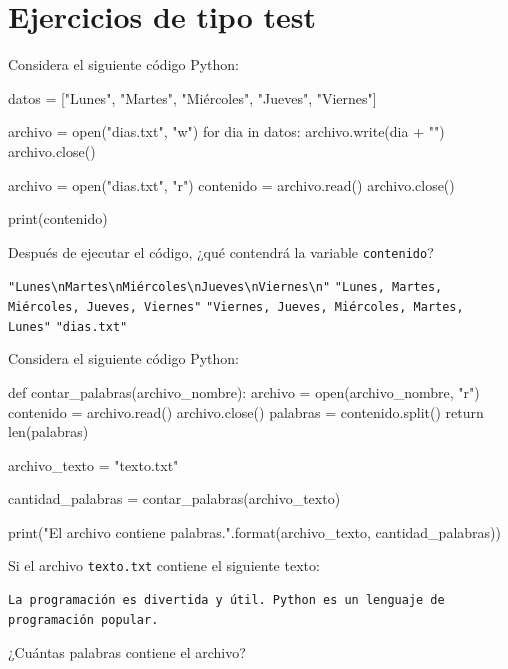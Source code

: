 \section*{Ejercicios de tipo test}



\begin{ejercicio}
Considera el siguiente código Python:

\begin{python}
datos = ["Lunes", "Martes", "Miércoles", "Jueves", "Viernes"]

archivo = open("dias.txt", "w")
for dia in datos:
    archivo.write(dia + "\n")
archivo.close()

archivo = open("dias.txt", "r")
contenido = archivo.read()
archivo.close()

print(contenido)
\end{python}

Después de ejecutar el código, ¿qué contendrá la variable \texttt{contenido}?

\begin{choices}
    \choice \texttt{"Lunes\textbackslash nMartes\textbackslash nMiércoles\textbackslash nJueves\textbackslash nViernes\textbackslash n"}
    \choice \texttt{"Lunes, Martes, Miércoles, Jueves, Viernes"}
    \choice \texttt{"Viernes, Jueves, Miércoles, Martes, Lunes"}
    \choice \texttt{"dias.txt"}
\end{choices}

\end{ejercicio}

\begin{ejercicio}
Considera el siguiente código Python:

\begin{python}
def contar_palabras(archivo_nombre):
    archivo = open(archivo_nombre, "r")
    contenido = archivo.read()
    archivo.close()
    palabras = contenido.split()
    return len(palabras)

archivo_texto = "texto.txt"

cantidad_palabras = contar_palabras(archivo_texto)

print("El archivo {} contiene {} palabras.".format(archivo_texto, cantidad_palabras))
\end{python}

Si el archivo \texttt{texto.txt} contiene el siguiente texto:\\

\begin{Verbatim}[frame=single]
La programación es divertida y útil. Python es un lenguaje de programación popular.
\end{Verbatim}

¿Cuántas palabras contiene el archivo?

\begin{choices}
\end{choices}

\end{ejercicio}

